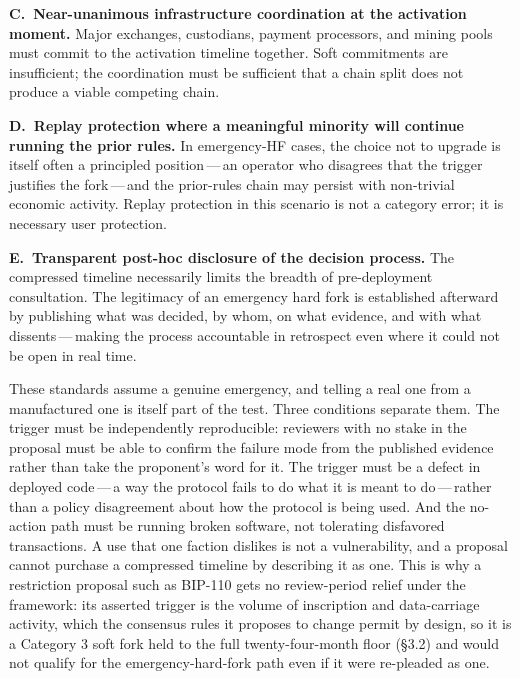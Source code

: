 \documentclass[11pt, twoside, openright]{book}
\newcommand{\reqitem}[2]{\medskip\noindent\textbf{#1\ #2}\quad\ignorespaces}
\newcommand{\sect}[1]{\S#1}
\begin{document}
\reqitem{C.}{Near-unanimous infrastructure coordination at the activation moment.} Major exchanges, custodians, payment processors, and mining pools must commit to the activation timeline together. Soft commitments are insufficient; the coordination must be sufficient that a chain split does not produce a viable competing chain.

\reqitem{D.}{Replay protection where a meaningful minority will continue running the prior rules.} In emergency-HF cases, the choice not to upgrade is itself often a principled position\,---\,an operator who disagrees that the trigger justifies the fork\,---\,and the prior-rules chain may persist with non-trivial economic activity. Replay protection in this scenario is not a category error; it is necessary user protection.

\reqitem{E.}{Transparent post-hoc disclosure of the decision process.} The compressed timeline necessarily limits the breadth of pre-deployment consultation. The legitimacy of an emergency hard fork is established afterward by publishing what was decided, by whom, on what evidence, and with what dissents\,---\,making the process accountable in retrospect even where it could not be open in real time.

\medskip

These standards assume a genuine emergency, and telling a real one from a manufactured one is itself part of the test. Three conditions separate them. The trigger must be independently reproducible: reviewers with no stake in the proposal must be able to confirm the failure mode from the published evidence rather than take the proponent's word for it. The trigger must be a defect in deployed code\,---\,a way the protocol fails to do what it is meant to do\,---\,rather than a policy disagreement about how the protocol is being used. And the no-action path must be running broken software, not tolerating disfavored transactions. A use that one faction dislikes is not a vulnerability, and a proposal cannot purchase a compressed timeline by describing it as one. This is why a restriction proposal such as BIP-110 gets no review-period relief under the framework: its asserted trigger is the volume of inscription and data-carriage activity, which the consensus rules it proposes to change permit by design, so it is a Category 3 soft fork held to the full twenty-four-month floor (\sect{3.2}) and would not qualify for the emergency-hard-fork path even if it were re-pleaded as one.

\medskip
\end{document}
